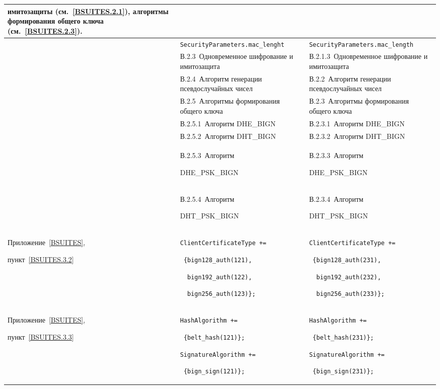 {\begin{center}
\begin{longtable}{|p{2.9cm}|p{6.4cm}|p{6.3cm}|}
имитозащиты (см.~\ref{BSUITES.2.1}), алгоритмы формирования общего ключа
(см.~\ref{BSUITES.2.3}).
\\
\hline
{}\par
{}\par
{}
&
\lstinline{SecurityParameters.mac_lenght}
&
\lstinline{SecurityParameters.mac_length}
\\
\hline
{}
&
В.2.3~Одновременное шифрование и имитозащита
&
В.2.1.3~Одновременное шифрование и имитозащита
\\
&
В.2.4~Алгоритм генерации псевдослучайных чисел
&
В.2.2~Алгоритм генерации псевдослучайных чисел
\\
&
В.2.5~Алгоритмы формирования общего ключа
&
В.2.3~Алгоритмы формирования общего ключа
\\
&
В.2.5.1~Алгоритм DHE\_BIGN
&
В.2.3.1~Алгоритм DHE\_BIGN
\\
&
В.2.5.2~Алгоритм DHT\_BIGN
&
В.2.3.2~Алгоритм DHT\_BIGN
\\
&
В.2.5.3~Алгоритм\par DHE\_PSK\_BIGN
&
В.2.3.3~Алгоритм\par DHE\_PSK\_BIGN
\\
&
В.2.5.4~Алгоритм\par DHT\_PSK\_BIGN
&
В.2.3.4~Алгоритм\par DHT\_PSK\_BIGN
\\
\hline
Приложение~\ref{BSUITES},\par
пункт~\ref{BSUITES.3.2} 
&
\lstinline|ClientCertificateType +=|\par
\lstinline| {bign128_auth(121),|\par
\lstinline|  bign192_auth(122),|\par
\lstinline|  bign256_auth(123)};|
&
\lstinline|ClientCertificateType +=|\par
\lstinline| {bign128_auth(231),|\par
\lstinline|  bign192_auth(232),|\par
\lstinline|  bign256_auth(233)};|
\\
\hline
Приложение~\ref{BSUITES},\par
пункт~\ref{BSUITES.3.3} 
&
\lstinline|HashAlgorithm +=|\par
\lstinline| {belt_hash(121)};|\par
\lstinline|SignatureAlgorithm +=|\par
\lstinline| {bign_sign(121)};|
&
\lstinline|HashAlgorithm +=|\par
\lstinline| {belt_hash(231)};|\par
\lstinline|SignatureAlgorithm +=|\par
\lstinline| {bign_sign(231)};|
\\
%
\hline
\end{longtable}
\end{center}
}

\thispagestyle{headings}

